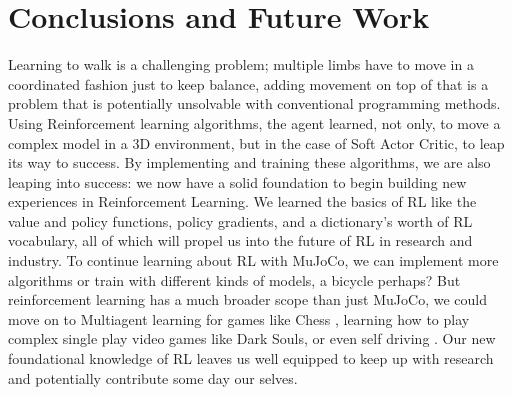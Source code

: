 \documentclass[conference]{IEEEtran}
\begin{document}
\blindtext

\section{Conclusions and Future Work}

Learning to walk is a challenging problem; multiple limbs have to move in a coordinated fashion just to keep balance, adding movement on top of that is a problem that is potentially unsolvable with conventional programming methods. Using Reinforcement learning algorithms, the agent learned, not only, to move a complex model in a 3D environment, but in the case of Soft Actor Critic, to leap its way to success. By implementing and training these algorithms, we are also leaping into success: we now have a solid foundation to begin building new experiences in Reinforcement Learning. We learned the basics of RL like the value and policy functions, policy gradients, and a dictionary's worth of RL vocabulary, all of which will propel us into the future of RL in research and industry.
To continue learning about RL with MuJoCo, we can implement more algorithms or train with different kinds of models, a bicycle perhaps? But reinforcement learning has a much broader scope than just MuJoCo, we could move on to Multiagent learning for games like Chess \cite{multiagent}, learning how to play complex single play video games like Dark Souls, or even self driving \cite{self_driving}. Our new foundational knowledge of RL leaves us well equipped to keep up with research and potentially contribute some day our selves.

\blindtext[2]




\end{document}
